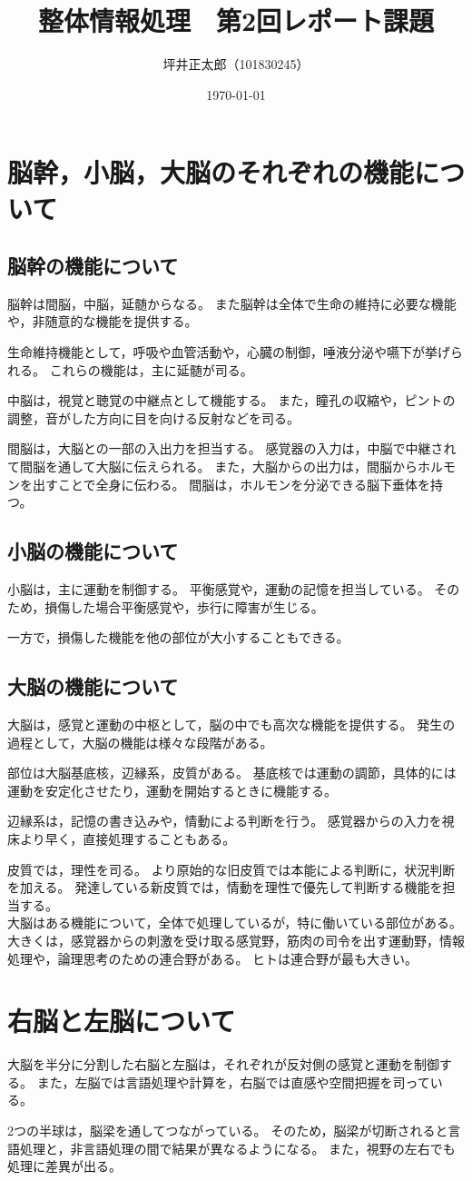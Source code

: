 \documentclass[a4paper,10pt]{jsarticle}
\begin{document}
\title{整体情報処理　第2回レポート課題}
\author{坪井正太郎（101830245）}
\date{\today}
\maketitle
\section{脳幹，小脳，大脳のそれぞれの機能について}
\subsection{脳幹の機能について}
脳幹は間脳，中脳，延髄からなる。
また脳幹は全体で生命の維持に必要な機能や，非随意的な機能を提供する。

生命維持機能として，呼吸や血管活動や，心臓の制御，唾液分泌や嚥下が挙げられる。
これらの機能は，主に延髄が司る。

中脳は，視覚と聴覚の中継点として機能する。
また，瞳孔の収縮や，ピントの調整，音がした方向に目を向ける反射などを司る。

間脳は，大脳との一部の入出力を担当する。
感覚器の入力は，中脳で中継されて間脳を通して大脳に伝えられる。
また，大脳からの出力は，間脳からホルモンを出すことで全身に伝わる。
間脳は，ホルモンを分泌できる脳下垂体を持つ。

\subsection{小脳の機能について}
小脳は，主に運動を制御する。
平衡感覚や，運動の記憶を担当している。
そのため，損傷した場合平衡感覚や，歩行に障害が生じる。

一方で，損傷した機能を他の部位が大小することもできる。

\subsection{大脳の機能について}
大脳は，感覚と運動の中枢として，脳の中でも高次な機能を提供する。
発生の過程として，大脳の機能は様々な段階がある。

部位は大脳基底核，辺縁系，皮質がある。
基底核では運動の調節，具体的には運動を安定化させたり，運動を開始するときに機能する。

辺縁系は，記憶の書き込みや，情動による判断を行う。
感覚器からの入力を視床より早く，直接処理することもある。

皮質では，理性を司る。
より原始的な旧皮質では本能による判断に，状況判断を加える。
発達している新皮質では，情動を理性で優先して判断する機能を担当する。\\

大脳はある機能について，全体で処理しているが，特に働いている部位がある。
大きくは，感覚器からの刺激を受け取る感覚野，筋肉の司令を出す運動野，情報処理や，論理思考のための連合野がある。
ヒトは連合野が最も大きい。

\section{右脳と左脳について}
大脳を半分に分割した右脳と左脳は，それぞれが反対側の感覚と運動を制御する。
また，左脳では言語処理や計算を，右脳では直感や空間把握を司っている。

2つの半球は，脳梁を通してつながっている。
そのため，脳梁が切断されると言語処理と，非言語処理の間で結果が異なるようになる。
また，視野の左右でも処理に差異が出る。
\end{document}
